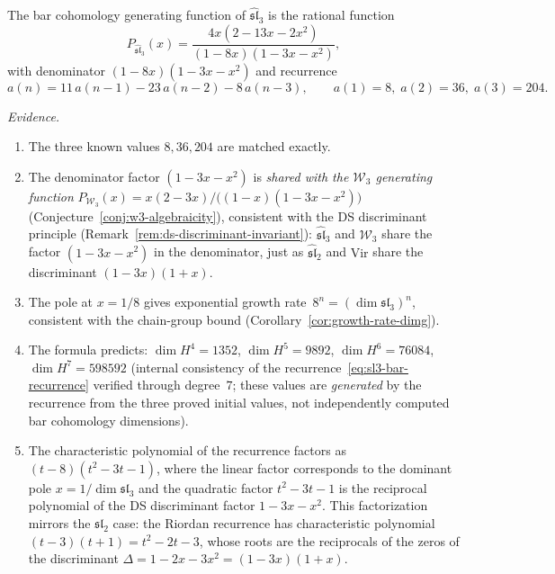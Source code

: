 \begin{conjecture}\label{conj:sl3-bar-gf}
The bar cohomology generating function of $\widehat{\mathfrak{sl}}_3$ is
the rational function
\begin{equation}\label{eq:sl3-bar-gf}
P_{\widehat{\mathfrak{sl}}_3}(x)
= \frac{4x(2 - 13x - 2x^2)}{(1 - 8x)(1 - 3x - x^2)},
\end{equation}
with denominator $(1-8x)(1-3x-x^2)$ and recurrence
\begin{equation}\label{eq:sl3-bar-recurrence}
a(n) = 11\,a(n{-}1) - 23\,a(n{-}2) - 8\,a(n{-}3),
\qquad a(1) = 8,\; a(2) = 36,\; a(3) = 204.
\end{equation}

\emph{Evidence.}

\begin{enumerate}[label=\textup{(\roman*)}]
\item The three known values $8, 36, 204$ are matched exactly.
\item The denominator factor $(1-3x-x^2)$ is
\emph{shared with the $\mathcal{W}_3$ generating function}
$P_{\mathcal{W}_3}(x) = x(2-3x)/\bigl((1-x)(1-3x-x^2)\bigr)$
(Conjecture~\ref{conj:w3-algebraicity}), consistent with
the DS discriminant principle
(Remark~\ref{rem:ds-discriminant-invariant}):
$\widehat{\mathfrak{sl}}_3$ and $\mathcal{W}_3$ share the
factor $(1-3x-x^2)$ in the denominator, just as
$\widehat{\mathfrak{sl}}_2$ and $\mathrm{Vir}$ share the
discriminant $(1-3x)(1+x)$.
\item The pole at $x = 1/8$ gives exponential growth rate~$8^n = (\dim\mathfrak{sl}_3)^n$,
consistent with the chain-group bound
(Corollary~\ref{cor:growth-rate-dimg}).
\item The formula predicts:
  $\dim H^4 = 1352$, $\dim H^5 = 9892$, $\dim H^6 = 76084$,
  $\dim H^7 = 598592$
  (internal consistency of the recurrence~\eqref{eq:sl3-bar-recurrence}
  verified through degree~$7$; these values are \emph{generated} by the
  recurrence from the three proved initial values, not independently
  computed bar cohomology dimensions).
\item The characteristic polynomial of the recurrence factors as
$(t - 8)(t^2 - 3t - 1)$, where the linear factor corresponds to the
dominant pole $x = 1/\dim\mathfrak{sl}_3$ and the quadratic factor
$t^2 - 3t - 1$ is the reciprocal polynomial of the DS discriminant
factor $1 - 3x - x^2$.  This factorization mirrors the $\mathfrak{sl}_2$
case: the Riordan recurrence has characteristic polynomial
$(t - 3)(t + 1) = t^2 - 2t - 3$, whose roots are the reciprocals of
the zeros of the discriminant $\Delta = 1 - 2x - 3x^2 = (1-3x)(1+x)$.
\end{enumerate}


\end{conjecture}
